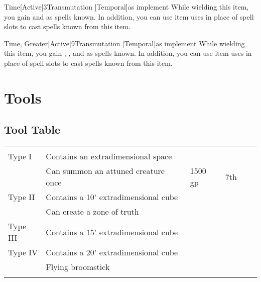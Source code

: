         \begin{magicitemdef}[Arcane]{Time}[Active]{3}{Transmutation [Temporal]}{as implement}
             While wielding this item, you gain  and  as spells known.
            In addition, you can use item uses in place of spell slots to cast spells known from this item.
        \end{magicitemdef}

        \begin{magicitemdef}[Arcane]{Time, Greater}[Active]{9}{Transmutation [Temporal]}{as implement}
             While wielding this item, you gain , , and  as spells known.
            In addition, you can use item uses in place of spell slots to cast spells known from this item.
        \end{magicitemdef}

\section{Tools}

    \onecolumn
    \subsection{Tool Table}

        \begin{longtabuwrapper}
            \begin{longtabu}{l X l l l l}
                 &  &  &  &  \\
                 Type I & Contains an extradimensional space &  &  \\
                 & Can summon an attuned creature once & 1500 gp & 7th &  \\
                 Type II & Contains a 10' extradimensional cube &  &  \\
                 & Can create a zone of truth &  &  \\
                 Type III & Contains a 15' extradimensional cube &  &  \\
                 Type IV & Contains a 20' extradimensional cube &  &  \\
                 & Flying broomstick &  &  \\

                 &  &  &  &  \\
            \end{longtabu}
        \end{longtabuwrapper}
        \twocolumn

